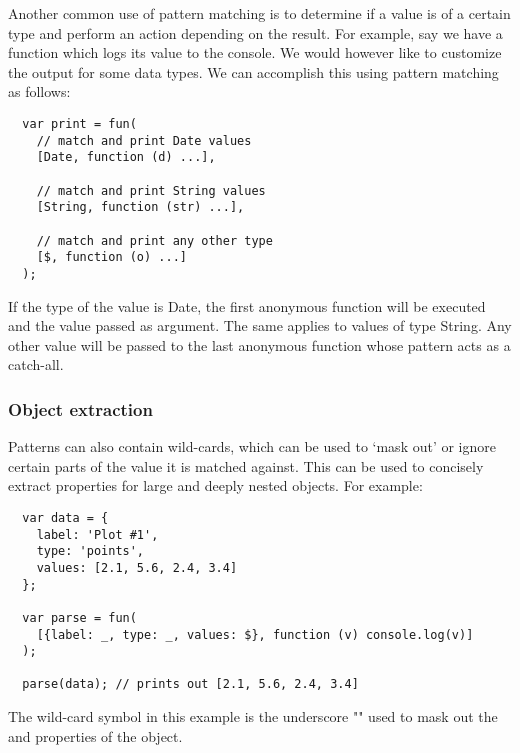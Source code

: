 Another common use of pattern matching is to determine if a value is of a certain type and perform an action depending on the result. For example, say we have a  function which logs its value to the console. We would however like to customize the output for some data types. We can accomplish this using pattern matching as follows:
\begin{verbatim}
  var print = fun(
    // match and print Date values
    [Date, function (d) ...],

    // match and print String values
    [String, function (str) ...],

    // match and print any other type
    [$, function (o) ...]
  );
\end{verbatim}
If the type of the value is Date, the first anonymous function will be executed and the value passed as argument. The same applies to values of type String. Any other value will be passed to the last anonymous function whose pattern acts as a catch-all. 

\subsubsection{Object extraction}
Patterns can also contain wild-cards, which can be used to ‘mask out’ or ignore certain parts of the value it is matched against. This can be used to concisely extract properties for large and deeply nested objects. For example:
\begin{verbatim}
  var data = {
    label: 'Plot #1',
    type: 'points',
    values: [2.1, 5.6, 2.4, 3.4]
  };

  var parse = fun(
    [{label: _, type: _, values: $}, function (v) console.log(v)]
  );

  parse(data); // prints out [2.1, 5.6, 2.4, 3.4]
\end{verbatim}

The wild-card symbol in this example is the underscore "\code{\_}" used to mask out the  and  properties of the  object.

